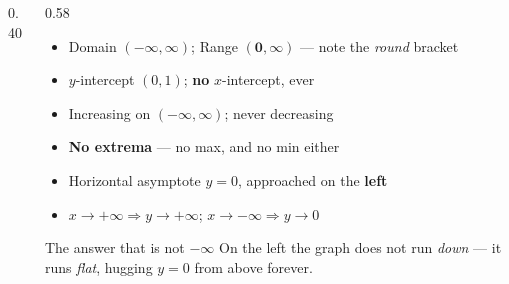 \documentclass[aspectratio=169, 11pt]{beamer}
\newcommand{\lgrid}[4]{%
  \draw[step=1, linegray!45, thin] (#1,#3) grid (#2,#4);
  \draw[->, thick, charcoal] (#1,0)--(#2,0) node[below right, font=\tiny]{$x$};
  \draw[->, thick, charcoal] (0,#3)--(0,#4) node[left, font=\tiny]{$y$};}
\newcommand{\expcurve}[4]{\draw[very thick, forest, domain=#3:#4, samples=120, smooth]
  plot (\x,{#1*exp((#2)*(\x))});}
\begin{document}
\begin{frame}[t, plain]
  \begin{columns}[T]
    \begin{column}{0.40\textwidth}
      \centering
    \end{column}
    \begin{column}{0.58\textwidth}
      \footnotesize
      \begin{itemize}\setlength{\itemsep}{3pt}
        \item Domain $(-\infty,\infty)$; \; Range $\mathbf{(0,\infty)}$ --- note the \emph{round} bracket
        \item $y$-intercept $(0,1)$; \; \textbf{no} $x$-intercept, ever
        \item Increasing on $(-\infty,\infty)$; never decreasing
        \item \textbf{No extrema} --- no max, and no min either
        \item Horizontal asymptote $y=0$, approached on the \textbf{left}
        \item $x\to+\infty \Rightarrow y\to+\infty$; \quad $x\to-\infty \Rightarrow y\to 0$
      \end{itemize}
      \vspace{2pt}
      \begin{block}{The answer that is not $-\infty$}
        On the left the graph does not run \emph{down} --- it runs \emph{flat}, hugging $y=0$ from
        above forever.
      \end{block}
    \end{column}
  \end{columns}
\end{frame}
\end{document}
